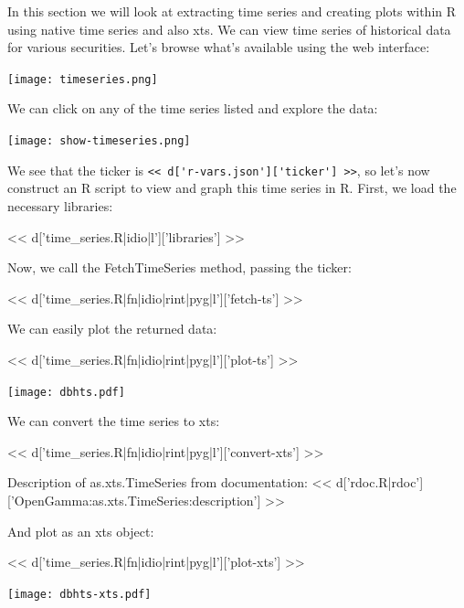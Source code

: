 \documentclass[custom, plainsections]{sciposter}
\begin{document}
\begin{multicols*}{2}
In this section we will look at extracting time series and creating plots within R using native time series and also xts.  We can view time series of historical data for various securities. Let's browse what's available using the web interface:

\vspace{0.5cm}
\texttt{[image: timeseries.png]}
\vspace{0.5cm}

We can click on any of the time series listed and explore the data:

\vspace{0.5cm}
\texttt{[image: show-timeseries.png]}
\vspace{0.5cm}

We see that the ticker is \verb|<< d['r-vars.json']['ticker'] >>|, so let's now construct an R script to view and graph this time series in R. First, we load the necessary libraries:

<< d['time_series.R|idio|l']['libraries'] >>

Now, we call the FetchTimeSeries method, passing the ticker:

<< d['time_series.R|fn|idio|rint|pyg|l']['fetch-ts'] >>

We can easily plot the returned data:

<< d['time_series.R|fn|idio|rint|pyg|l']['plot-ts'] >>

\texttt{[image: dbhts.pdf]}

We can convert the time series to xts:

<< d['time_series.R|fn|idio|rint|pyg|l']['convert-xts'] >>

Description of as.xts.TimeSeries from documentation: << d['rdoc.R|rdoc']['OpenGamma:as.xts.TimeSeries:description'] >>

And plot as an xts object:

<< d['time_series.R|fn|idio|rint|pyg|l']['plot-xts'] >>

\texttt{[image: dbhts-xts.pdf]}

\end{multicols*}
\end{document}
